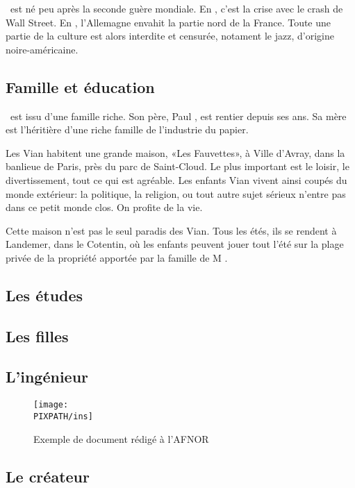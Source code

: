 \BV\ est né peu après la seconde guère mondiale. En , c'est
la crise avec le crash de Wall Street. En , l'Allemagne envahit la
partie nord de la France. Toute une partie de la culture est alors
interdite et censurée, notament le jazz, d'origine noire-américaine.

\subsection{Famille et éducation}

\BV \ est issu d'une famille riche. Son père, Paul , est rentier
depuis ses  ans. Sa mère est l'héritière d'une riche famille de l'industrie
du papier.

Les Vian habitent une grande maison, «Les Fauvettes», à Ville d'Avray, dans la
banlieue de Paris, près du parc de Saint-Cloud. Le plus important est le loisir,
le divertissement, tout ce qui est agréable. Les enfants Vian vivent ainsi coupés
du monde extérieur: la politique, la religion, ou tout autre sujet sérieux n'entre
pas dans ce petit monde clos. On profite de la vie.

Cette maison n'est pas le seul paradis des Vian. Tous les étés, ils se rendent
à Landemer, dans le Cotentin, où les enfants peuvent jouer tout l'été sur la
plage privée de la propriété apportée par la famille de  M . 

\subsection{Les études}

\subsection{Les filles}

\subsection{L'ingénieur}

\begin{figure}
\centering
\texttt{[image: \\PIXPATH/ins]}
\caption{Exemple de document rédigé à l'AFNOR}
\label{ins}
\end{figure}

\subsection{Le créateur}

